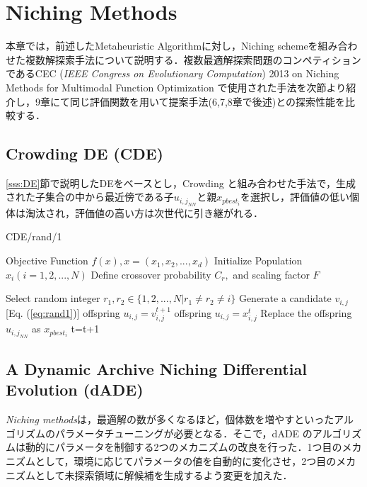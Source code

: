 \documentclass[a4j,11pt]{jarticle}
\begin{document}

\newpage
\section{Niching Methods}
\label{sec:nm}
本章では，前述したMetaheuristic Algorithmに対し，Niching schemeを組み合わせた複数解探索手法について説明する．複数最適解探索問題のコンペティションであるCEC ({\it IEEE Congress on Evolutionary Computation})  2013 on Niching Methods for Multimodal Function Optimization \cite{CEC2013} で使用された手法を次節より紹介し，9章にて同じ評価関数を用いて提案手法(6,7,8章で後述)との探索性能を比較する．

\subsection{Crowding DE (CDE)}
\label{ss:cde}
\ref{sss:DE}節で説明したDEをベースとし，Crowding \cite{Crowding} と組み合わせた手法で，生成された子集合の中から最近傍である子$u_{{i,j}_{NN}}$と親$x_{pbest_i}$を選択し，評価値の低い個体は淘汰され，評価値の高い方は次世代に引き継がれる．

\begin{algorithm}[H]
\caption{CDE/rand/1}
\label{code:cde}
\begin{algorithmic}[3]
\REQUIRE Objective Function $f(x), x=(x_1,x_2,...,x_d)$
\STATE Initialize Population $x_i (i=1,2,...,N)$ 
\STATE Define crossover probability $C_r,$ and scaling factor $F$

\STATE Select random integer $r_1, r_2 \in \{ 1,2,..., N| r_1 \neq r_2 \neq i\}$
\STATE Generate a candidate $v_{i,j}$  [Eq. (\ref{eq:rand1})]
\STATE offspring $u_{i,j} = v_{i,j}^{t+1}$
\STATE offspring $u_{i,j} = x_{i,j}^t$
\ENDIF
\ENDFOR
{}
\STATE Replace the offspring $u_{{i,j}_{NN}}$ as $x_{pbest_i}$
\ENDIF
\ENDFOR
\STATE t=t+1
\ENDWHILE
\end{algorithmic}
\end{algorithm}

\subsection{A Dynamic Archive Niching Differential Evolution (dADE)}
\label{ss:dADE}
{\it Niching methods}は，最適解の数が多くなるほど，個体数を増やすといったアルゴリズムのパラメータチューニングが必要となる．そこで，dADE \cite{dADE} のアルゴリズムは動的にパラメータを制御する2つのメカニズムの改良を行った．1つ目のメカニズムとして，環境に応じてパラメータの値を自動的に変化させ，2つ目のメカニズムとして未探索領域に解候補を生成するよう変更を加えた．
\end{document}
